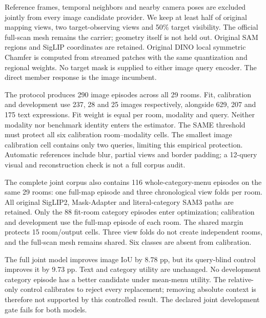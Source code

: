 \documentclass[10pt]{article}
\begin{document}
Reference frames, temporal neighbors and nearby camera poses are excluded
jointly from every image candidate provider. We keep at least half of original
mapping views, two target-observing views and 50\% target visibility. The official
full-scan mesh remains the carrier; geometry itself is not held out. Original
SAM regions and SigLIP coordinates are retained. Original DINO local symmetric
Chamfer is computed from streamed patches with the same quantization and
regional weights. No target mask is supplied to either image query encoder.
The direct member response is the image incumbent.

The protocol produces 290 image episodes across all 29 rooms. Fit, calibration
and development use 237, 28 and 25 images respectively, alongside 629, 207 and
175 text expressions. Fit weight is equal per room, modality and query. Neither
modality nor benchmark identity enters the estimator. The SAME threshold must
protect all six calibration room--modality cells. The smallest image calibration
cell contains only two queries, limiting this empirical protection. Automatic
references include blur, partial views and border padding; a 12-query visual
and reconstruction check is not a full corpus audit.

The complete joint corpus also contains 116 whole-category-menu episodes on
the same 29 rooms: one full-map episode and three chronological view folds per
room. All original SigLIP2, Mask-Adapter and literal-category SAM3 paths are
retained. Only the 88 fit-room category episodes enter optimization; calibration
and development use the full-map episode of each room. The shared margin
protects 15 room/output cells. Three view folds do not create independent rooms,
and the full-scan mesh remains shared. Six classes are absent from calibration.

\begin{table}[ht]
\centering\small
\caption{Joint text, image and whole-menu utility on the four opened development
rooms (\%). Relative denotes the fixed control that removes absolute signature
and set-mean context. Category utility averages the three menu outputs. These
development results are distinct from target-benchmark transfer.}
\end{table}
The full joint model improves image IoU by 8.78 pp, but its query-blind control
improves it by 9.73 pp. Text and category utility are unchanged. No development
category episode has a better candidate under mean-menu utility. The relative-only
control calibrates to reject every replacement; removing absolute context is
therefore not supported by this controlled result. The declared joint development
gate fails for both models.
\end{document}
